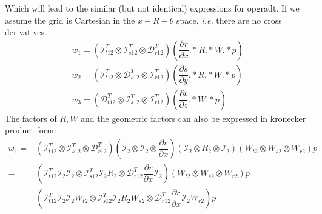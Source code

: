 \documentclass{kthreport}
\begin{document}
Which will lead to the similar (but not identical) expressions for opgradt. If we assume the grid is Cartesian in the $x-R-\theta$ space, \textit{i.e.} there are no cross derivatives.
\begin{subequations}
	\begin{eqnarray}
		w_{1}	= (\mathcal{I}^{T}_{t12}\otimes\mathcal{I}^{T}_{s12}\otimes\mathcal{D}^{T}_{r12})(\dfrac{\partial r}{\partial x}.*R.*W.*p) \\
		w_{2}	= (\mathcal{I}^{T}_{t12}\otimes\mathcal{D}^{T}_{s12}\otimes\mathcal{I}^{T}_{r12})(\dfrac{\partial s}{\partial y}.*R.*W.*p) \\
		w_{3}	= (\mathcal{D}^{T}_{t12}\otimes\mathcal{I}^{T}_{s12}\otimes\mathcal{I}^{T}_{r12})(\dfrac{\partial t}{\partial z}.*W.*p)
	\end{eqnarray}
\end{subequations}
The factors of $R,W$ and the geometric factors can also be expressed in kronecker product form:
\begin{subequations}
	\begin{eqnarray}
		w_{1}	=& (\mathcal{I}^{T}_{t12}\otimes\mathcal{I}^{T}_{s12}\otimes\mathcal{D}^{T}_{r12})(\mathcal{I}_{2}\otimes\mathcal{I}_{2}\otimes\dfrac{\partial r}{\partial x})(\mathcal{I}_{2}\otimes R_{2}\otimes\mathcal{I}_{2})(W_{t2}\otimes W_{s2}\otimes W_{r2})p \\
					  =& (\mathcal{I}^{T}_{t12}\mathcal{I}_{2}\mathcal{I}_{2}\otimes\mathcal{I}^{T}_{s12}\mathcal{I}_{2}R_{2}\otimes\mathcal{D}^{T}_{r12}\dfrac{\partial r}{\partial x}\mathcal{I}_{2})(W_{t2}\otimes W_{s2}\otimes W_{r2})p \\
					  =& (\mathcal{I}^{T}_{t12}\mathcal{I}_{2}\mathcal{I}_{2}W_{t2}\otimes\mathcal{I}^{T}_{s12}\mathcal{I}_{2}R_{2}W_{s2}\otimes\mathcal{D}^{T}_{r12}\dfrac{\partial r}{\partial x}\mathcal{I}_{2}W_{r2})p					  
	\end{eqnarray}
\end{subequations}
\end{document}
